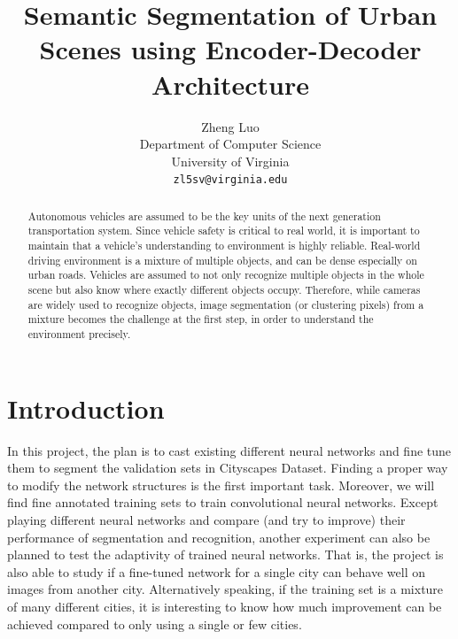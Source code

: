 \documentclass[10pt,twocolumn,letterpaper]{article}
\begin{document}
\title{Semantic Segmentation of Urban Scenes using Encoder-Decoder Architecture}

\author{Zheng Luo\\
Department of Computer Science\\
University of Virginia\\
{\tt\small zl5sv@virginia.edu}
}

\maketitle

\begin{abstract}
   Autonomous vehicles are assumed to be the key units of the next generation transportation system. Since vehicle safety is critical to real world, it is important to maintain that a vehicle’s understanding to environment is highly reliable. Real-world driving environment is a mixture of multiple objects, and can be dense especially on urban roads. Vehicles are assumed to not only recognize multiple objects in the whole scene but also know where exactly different objects occupy. Therefore, while cameras are widely used to recognize objects, image segmentation (or clustering pixels) from a mixture becomes the challenge at the first step, in order to understand the environment precisely.
\end{abstract}




\section{Introduction}

In this project, the plan is to cast existing different neural networks and fine tune them to segment the validation sets in Cityscapes Dataset. Finding a proper way to modify the network structures is the first important task. Moreover, we will find fine annotated training sets to train convolutional neural networks. Except playing different neural networks and compare (and try to improve) their performance of segmentation and recognition, another experiment can also be planned to test the adaptivity of trained neural networks. That is, the project is also able to study if a fine-tuned network for a single city can behave well on images from another city. Alternatively speaking, if the training set is a mixture of many different cities, it is interesting to know how much improvement can be achieved compared to only using a single or few cities.
\end{document}

